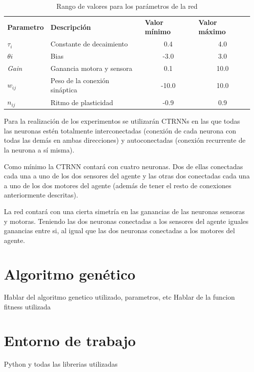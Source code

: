 \begin{table}[!h]
\centering
\label{table:tablaValoresParametros}
\begin{tabular}{l|l|c|c}
\textbf{Parametro} & \textbf{Descripción}          & \multicolumn{1}{l|}{\textbf{Valor mínimo}} & \multicolumn{1}{l}{\textbf{Valor máximo}} \\
\textit{$\tau_{i}$}       & Constante de decaimiento      & 0.4                                        & 4.0                                       \\
\textit{$\theta{i}$}      & Bias                          & -3.0                                       & 3.0                                       \\
\textit{Gain}      & Ganancia motora y sensora     & 0.1                                        & 10.0                                      \\
\textit{$w_{ij}$}      & Peso de la conexión sináptica & -10.0                                      & 10.0                                      \\
\textit{$n_{ij}$}     & Ritmo de plasticidad          & -0.9                                       & 0.9
\end{tabular}
\caption{Rango de valores para los parámetros de la red}
\end{table}

Para la realización de los experimentos se utilizarán CTRNNs en las que todas las neuronas
estén totalmente interconectadas (conexión de cada neurona con todas las demás en ambas direcciones) y
autoconectadas (conexión recurrente de la neurona a sí misma).

Como mínimo la CTRNN contará con cuatro neuronas. Dos de ellas conectadas cada una a uno de los dos sensores del agente y las otras dos conectadas cada una a uno de los dos motores del agente (además de
tener el resto de conexiones anteriormente descritas).

La red contará con una cierta simetría en las ganancias de las neuronas sensoras y motoras. Teniendo las dos neuronas conectadas a los sensores del agente iguales ganancias entre si, al igual que las dos neuronas conectadas
a los motores del agente.




\section{Algoritmo genético}
Hablar del algoritmo genetico utilizado, parametros, etc
Hablar de la funcion fitness utilizada

\section{Entorno de trabajo}
Python y todas las librerias utilizadas
